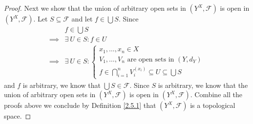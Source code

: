 \begin{proof}
    Next we show that the union of arbitrary open sets in \((Y^X, \mathcal{F})\) is open in \((Y^X, \mathcal{F})\).
    Let \(S \subseteq \mathcal{F}\) and let \(f \in \bigcup S\).
    Since
    \begin{align*}
                 & f \in \bigcup S                                                                       \\
        \implies & \exists\ U \in S : f \in U                                                            \\
        \implies & \exists\ U \in S : \begin{cases}
                                          x_1, \dots, x_n \in X                              \\
                                          V_1, \dots, V_n \text{ are open sets in } (Y, d_Y) \\
                                          f \in \bigcap_{i = 1}^n V_i^{(x_i)} \subseteq U \subseteq \bigcup S
                                      \end{cases}
    \end{align*}
    and \(f\) is arbitrary, we know that \(\bigcup S \in \mathcal{F}\).
    Since \(S\) is arbitrary, we know that the union of arbitrary open sets in \((Y^X, \mathcal{F})\) is open in \((Y^X, \mathcal{F})\).
    Combine all the proofs above we conclude by Definition \ref{2.5.1} that \((Y^X, \mathcal{F})\) is a topological space.


\end{proof}
